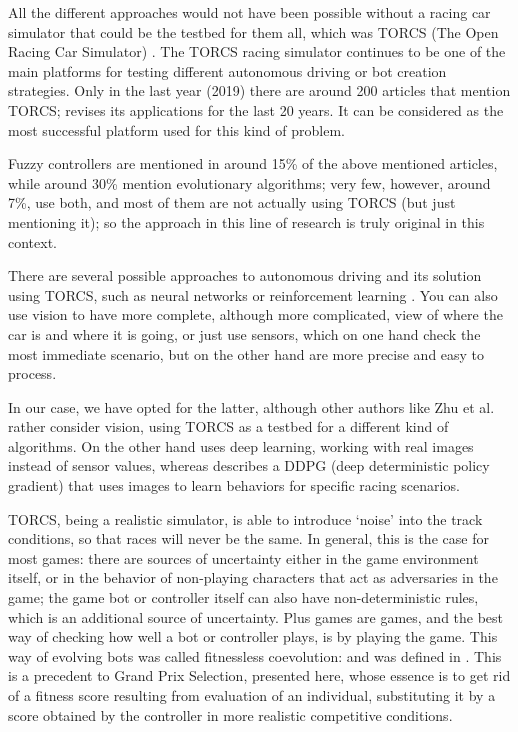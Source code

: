 \documentclass[10pt,journal,compsoc]{IEEEtran}
\begin{document}

All the different approaches would not have been possible without a
racing car simulator that could be the testbed for them all, which was
TORCS (The Open Racing Car Simulator) \cite{torcs4}. The TORCS racing simulator
continues to be one of the main platforms for testing different autonomous driving or bot creation strategies. Only in the last year (2019) there are around 200 articles that mention TORCS; \cite{badue2019selfdriving} revises its applications for the last 20 years. It can be considered as the most successful platform used for this kind of problem.

Fuzzy controllers are mentioned in around 15\% of the above mentioned articles, while around 30\% mention evolutionary algorithms; very few, however, around 7\%, use both, and most of them are not actually using TORCS (but just mentioning it); so the approach in this line of research is truly original in this context.

There are several possible approaches to autonomous driving and its
solution using TORCS, such as neural networks or reinforcement learning \cite{abuzekry2comparative}. 
You can also use vision to have more complete, although more complicated, view of where the car is and where it is going, or just use sensors, which on one hand check the most immediate scenario, but on the other hand are more precise and easy to process.

In our case, we have opted for the latter, although other authors like Zhu et al. \cite{zhu2019vision} rather
consider vision, using TORCS as a testbed for a different kind of
algorithms. On the other hand \cite{8833873} uses deep learning, working with real images instead of sensor values, whereas \cite{Kaushik_2018_ECCV_Workshops} describes a DDPG (deep deterministic policy gradient) that uses images to learn behaviors for specific racing scenarios.

TORCS, being a realistic simulator, is able to introduce `noise' into
the track conditions, so that races will never be the same. In
general, this is the case for most games: there are sources of
uncertainty either in the game environment itself, or in the behavior
of non-playing characters that act as adversaries in the game; the
game bot or controller itself can also have non-deterministic rules,
which is an additional source of uncertainty. Plus games are games,
and the best way of checking how well a bot or controller plays, is by
playing the game. This way of evolving bots was called fitnessless
coevolution: and was defined in
\cite{Jaskowski:2008:FC:1389095.1389161}. This is a precedent to
Grand Prix Selection, presented here, whose essence is
to get rid of a fitness score resulting from evaluation of an
individual, substituting it by a score obtained by the controller in
more realistic competitive conditions.
\end{document}
